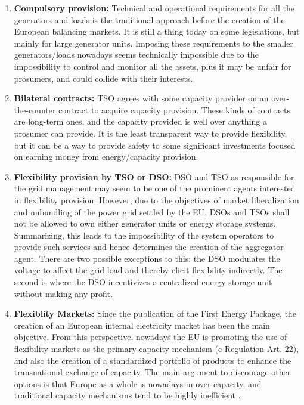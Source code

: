 \begin{enumerate}
\item \textbf{Compulsory provision:} Technical and operational requirements for all the generators and loads is the traditional approach before the creation of the European balancing markets. It is still a thing today on some legislations, but mainly for large generator units. Imposing these requirements to the smaller generators/loads nowadays seems technically impossible due to the impossibility to control and monitor all the assets, plus it may be unfair for prosumers, and could collide with their interests.
\item \textbf{Bilateral contracts:} TSO agrees with some capacity provider on an over-the-counter contract to acquire capacity provision. These kinds of contracts are long-term ones, and the capacity provided is well over anything a prosumer can provide. It is the least transparent way to provide flexibility, but it can be a way to provide safety to some significant investments focused on earning money from energy/capacity provision. 
\item  \textbf{Flexibility provision by TSO or DSO:} DSO and TSO as responsible for the grid management may seem to be one of the prominent agents interested in flexibility provision. However, due to the objectives of market liberalization and unbundling of the power grid settled by the EU, DSOs and TSOs shall not be allowed to own either generator units or energy storage systems. Summarizing, this leads to the impossibility of the system operators to provide such services and hence determines the creation of the aggregator agent. There are two possible exceptions to this: the DSO modulates the voltage to affect the grid load and thereby elicit flexibility indirectly. The second is where the DSO incentivizes a centralized energy storage unit without making any profit. 
\item  \textbf{Flexiblity Markets:} Since the publication of the First Energy Package, the creation of an European internal electricity market has been the main objective. From this perspective, nowadays the EU is promoting the use of flexibility markets as the primary capacity mechanism \cite{Directive2019943} (e-Regulation Art. 22), and also the creation of a standardized portfolio of products to enhance the transnational exchange of capacity. The main argument to discourage other options is that Europe as a whole is nowadays in over-capacity, and traditional capacity mechanisms tend to be highly inefficient \cite{Hancher2017, validzic2017clean}.
\end{enumerate}

